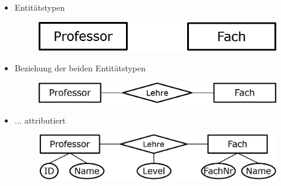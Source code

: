 \begin{frame}{\insertsection}
\begin{itemize}
	\item Entit\"atstypen
 	 \begin{figure}
		\includegraphics[scale=0.5]{img/ERM-BeispielEntitaetTyp.png}
	 \end{figure}  
	\item Beziehung der beiden Entit\"atstypen
	 \begin{figure}
	  \includegraphics[scale=0.5]{img/ERM-BeispielEntitaetRelationTyp.png}
   \end{figure}  
 \item ... attributiert
  \begin{figure}
	 \includegraphics[scale=0.5]{img/ERM-BeispielEntitaetRelationAttributTyp.png}
  \end{figure}  
\end{itemize}
\end{frame}

